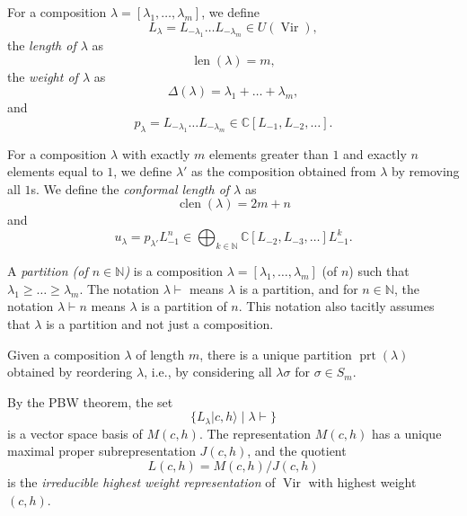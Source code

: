 \documentclass[a4paper, 12pt, reqno]{amsart}
\theoremstyle{remark}
\DeclareMathOperator{\Vir}{Vir}
\DeclareMathOperator{\len}{len}
\DeclareMathOperator{\clen}{clen}
\DeclareMathOperator{\prt}{prt}
\begin{document}
For a composition $\lambda = [\lambda_1, \dots, \lambda_m]$, we define
\begin{equation*}
  L_{\lambda} = L_{-\lambda_1}\dots L_{-\lambda_m} \in U(\Vir),
\end{equation*}
the \emph{length of $\lambda$} as
\begin{equation*}
  \len(\lambda) = m,
\end{equation*}
the \emph{weight of $\lambda$} as
\begin{equation*}
  \Delta(\lambda) = \lambda_1 + \dots + \lambda_m,
\end{equation*}
and
\begin{equation*}
  p_{\lambda} = L_{-\lambda_1}\dots L_{-\lambda_m} \in \mathbb{C}[L_{-1}, L_{-2}, \dots].
\end{equation*}

For a composition $\lambda$ with exactly $m$ elements greater than $1$ and exactly $n$ elements equal to $1$, we define $\lambda'$ as the composition obtained from $\lambda$ by removing all $1$s.
We define the \emph{conformal length of $\lambda$} as
\begin{equation*}
  \clen(\lambda) = 2m + n
\end{equation*}
and
\begin{equation*}
  u_{\lambda} = p_{\lambda'}L_{-1}^n \in \bigoplus_{k \in \mathbb{N}}\mathbb{C}[L_{-2}, L_{-3}, \dots]L_{-1}^k.
\end{equation*}

A \emph{partition (of $n \in \mathbb{N}$)} is a composition $\lambda = [\lambda_1, \dots, \lambda_m]$ (of $n$) such that $\lambda_1 \ge \dots \ge \lambda_m$.
The notation $\lambda \vdash$ means $\lambda$ is a partition, and for $n \in \mathbb{N}$, the notation $\lambda \vdash n$ means $\lambda$ is a partition of $n$.
This notation also tacitly assumes that $\lambda$ is a partition and not just a composition.

Given a composition $\lambda$ of length $m$, there is a unique partition $\prt(\lambda)$ obtained by reordering $\lambda$, i.e., by considering all $\lambda\sigma$ for $\sigma \in S_m$.

By the PBW theorem, the set
\begin{equation*}
  \{L_{\lambda}|c, h\rangle \mid \lambda \vdash\}
\end{equation*}
is a vector space basis of $M(c, h)$.
The representation $M(c, h)$ has a unique maximal proper subrepresentation $J(c, h)$, and the quotient
\begin{equation*}
  L(c, h) = M(c, h)/J(c, h)
\end{equation*}
is the \emph{irreducible highest weight representation} of $\Vir$ with highest weight $(c, h)$.
\end{document}
